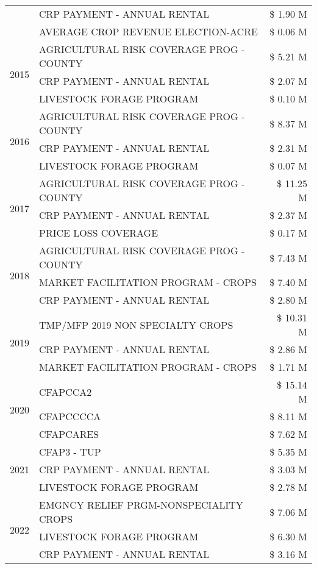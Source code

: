 \begin{tabular}{llr}
 & CRP PAYMENT - ANNUAL RENTAL & \$ 1.90 M \\
 & AVERAGE CROP REVENUE ELECTION-ACRE & \$ 0.06 M \\
\cline{1-3}
\multirow[t]{3}{*}{2015} & AGRICULTURAL RISK COVERAGE PROG - COUNTY & \$ 5.21 M \\
 & CRP PAYMENT - ANNUAL RENTAL & \$ 2.07 M \\
 & LIVESTOCK FORAGE PROGRAM & \$ 0.10 M \\
\cline{1-3}
\multirow[t]{3}{*}{2016} & AGRICULTURAL RISK COVERAGE PROG - COUNTY & \$ 8.37 M \\
 & CRP PAYMENT - ANNUAL RENTAL & \$ 2.31 M \\
 & LIVESTOCK FORAGE PROGRAM & \$ 0.07 M \\
\cline{1-3}
\multirow[t]{3}{*}{2017} & AGRICULTURAL RISK COVERAGE PROG - COUNTY & \$ 11.25 M \\
 & CRP PAYMENT - ANNUAL RENTAL & \$ 2.37 M \\
 & PRICE LOSS COVERAGE & \$ 0.17 M \\
\cline{1-3}
\multirow[t]{3}{*}{2018} & AGRICULTURAL RISK COVERAGE PROG - COUNTY & \$ 7.43 M \\
 & MARKET FACILITATION PROGRAM - CROPS & \$ 7.40 M \\
 & CRP PAYMENT - ANNUAL RENTAL & \$ 2.80 M \\
\cline{1-3}
\multirow[t]{3}{*}{2019} & TMP/MFP 2019 NON SPECIALTY CROPS & \$ 10.31 M \\
 & CRP PAYMENT - ANNUAL RENTAL & \$ 2.86 M \\
 & MARKET FACILITATION PROGRAM - CROPS & \$ 1.71 M \\
\cline{1-3}
\multirow[t]{3}{*}{2020} & CFAPCCA2 & \$ 15.14 M \\
 & CFAPCCCCA & \$ 8.11 M \\
 & CFAPCARES & \$ 7.62 M \\
\cline{1-3}
\multirow[t]{3}{*}{2021} & CFAP3 - TUP & \$ 5.35 M \\
 & CRP PAYMENT - ANNUAL RENTAL & \$ 3.03 M \\
 & LIVESTOCK FORAGE PROGRAM & \$ 2.78 M \\
\cline{1-3}
\multirow[t]{3}{*}{2022} & EMGNCY RELIEF PRGM-NONSPECIALITY CROPS & \$ 7.06 M \\
 & LIVESTOCK FORAGE PROGRAM & \$ 6.30 M \\
 & CRP PAYMENT - ANNUAL RENTAL & \$ 3.16 M \\
\cline{1-3}
\bottomrule
\end{tabular}
